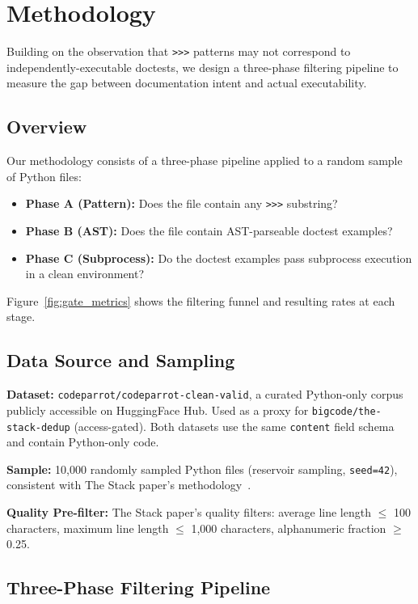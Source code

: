\section{Methodology}
\label{sec:methodology}

Building on the observation that \texttt{>>>} patterns may not correspond to
independently-executable doctests, we design a three-phase filtering pipeline to measure
the gap between documentation intent and actual executability.

\subsection{Overview}

Our methodology consists of a three-phase pipeline applied to a random sample of Python files:

\begin{itemize}
\item \textbf{Phase A (Pattern):} Does the file contain any \texttt{>>>} substring?
\item \textbf{Phase B (AST):} Does the file contain AST-parseable doctest examples?
\item \textbf{Phase C (Subprocess):} Do the doctest examples pass subprocess execution in a clean environment?
\end{itemize}

Figure~\ref{fig:gate_metrics} shows the filtering funnel and resulting rates at each stage.

\subsection{Data Source and Sampling}

\textbf{Dataset:} \texttt{codeparrot/codeparrot-clean-valid}, a curated Python-only corpus
publicly accessible on HuggingFace Hub. Used as a proxy for \texttt{bigcode/the-stack-dedup}
(access-gated). Both datasets use the same \texttt{content} field schema and contain
Python-only code.

\textbf{Sample:} 10,000 randomly sampled Python files (reservoir sampling, \texttt{seed=42}),
consistent with The Stack paper's methodology~\cite{Kocetkov2022Stack}.

\textbf{Quality Pre-filter:} The Stack paper's quality filters: average line length
$\leq$ 100 characters, maximum line length $\leq$ 1,000 characters, alphanumeric fraction
$\geq$ 0.25.

\subsection{Three-Phase Filtering Pipeline}

